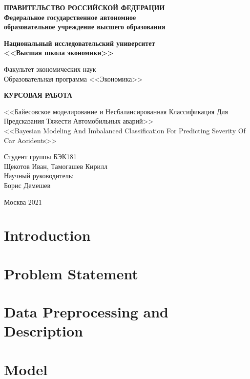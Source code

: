 \documentclass[a4paper,10pt]{extarticle}
\begin{document}
\thispagestyle{empty}
\begin{center}
	\textbf{ПРАВИТЕЛЬСТВО РОССИЙСКОЙ ФЕДЕРАЦИИ}\\
	\vspace{3ex}
	\textbf{Федеральное государственное автономное\\ образовательное учреждение высшего образования}

	\vspace{3ex}

	\textbf{Национальный исследовательский университет \\ <<Высшая школа экономики>>}

	\vspace{10ex}
	\begin{flushright}
		Факультет экономических наук\\
		Образовательная программа <<Экономика>>
		\end{flushright}
\end{center}
\vspace{12ex}

\begin{center}
	{\textbf{КУРСОВАЯ РАБОТА
	}}
	\vspace{1ex}

	<<Байесовское моделирование и Несбалансированная Классификация Для Предсказания Тяжести Автомобильных аварий>> \\
	<<Bayesian Modeling And Imbalanced Classification For Predicting Severity Of Car Accidents>>
\end{center}
\vspace{4ex}
\begin{flushright}
	\noindent
	Студент группы БЭК181\\Щекотов Иван, Тамогашев Кирилл\\
	\vspace{13ex}
	Научный руководитель:\\
	Борис Демешев

\end{flushright}

\vfill

\begin{center}
	Москва 2021

\end{center}
\newpage
\tableofcontents
\newpage
\section{Introduction}

\section{Problem Statement}

\section{Data Preprocessing and Description}

%
\section{Model}

\cleardoublepage
{}
{}

\end{document}
